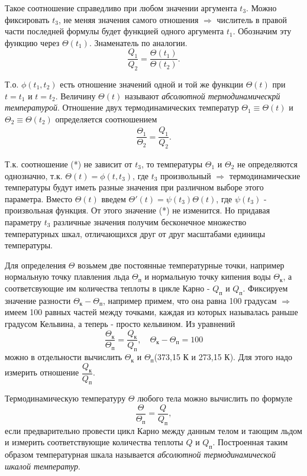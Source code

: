 \documentclass[14pt,a4paper]{scrartcl}
\begin{document}
		\quad Такое соотношение справедливо при любом значении аргумента $t_3$. Можно фиксировать  $t_3$, не меняя значения самого отношения $\Rightarrow$ числитель в правой части последней формулы будет функцией одного аргумента $t_1$. Обозначим эту функцию через $\Theta(t_1)$. Знаменатель по аналогии. $$\dfrac{Q_1}{Q_2} = \dfrac{\Theta(t_1)}{\Theta(t_2)}.$$
		
		\quad Т.о. $ \phi(t_1, t_2) $ есть отношение значений одной и той же функции $\Theta(t)$ при $t = t_1$ и $t = t_2$.  Величину $\Theta(t)$ называют \textit{абсолютной термодинамическрй температурой}. Отношение двух термодинамических температур $\Theta_1 \equiv \Theta(t)$ и $\Theta_2 \equiv \Theta(t_2)$ определяется соотношением \begin{align}\dfrac{\Theta_1}{\Theta_2} = \dfrac{Q_1}{Q_2}.\tag{*}\end{align}
		
		\quad Т.к. соотношение (*) не зависит от $t_3$, то температуры $\Theta_1$ и $\Theta_2$ не определяются однозначно, т.к. $\Theta(t) = \phi(t, t_3)$, где $t_3$ произвольный $\Rightarrow$ термодинамические температуры будут иметь разные значения при различном выборе этого параметра. Вместо $\Theta(t)$ введем $\Theta'(t) = \psi(t_3)\Theta(t)$, где $\psi(t_3)$ - произвольная функция. От этого значение (*) не изменится. Но придавая параметру $t_3$ различные значения получим бесконечное множество температурных шкал, отличающихся друг от друг масштабами единицы температуры.
		
		\quad Для определения $\Theta$ возьмем две постоянные температурные точки, например нормальную точку плавления льда $\Theta_{\text{п}}$ и нормальную точку кипения воды  $\Theta_{\text{к}}$, а соответсвующие им количества теплоты в цикле Карно - $Q_{\text{п}}$ и $Q_{\text{п}}$. Фиксируем значение разности $\Theta_{\text{к}} - \Theta_{\text{п}}$, например примем, что она равна 100  градусам $\Rightarrow$ имеем 100 равных частей между точками, каждая из которых называлась раньше градусом Кельвина, а теперь - просто кельвином. Из уравнений $$\dfrac{\Theta_{\text{к}}}{\Theta_{\text{п}}} = \dfrac{Q_{\text{к}}}{Q_{\text{п}}}, \quad \Theta_{\text{к}} - \Theta_{\text{п}} = 100$$ можно в отдельности вычислить  $ \Theta_{\text{к}}  $ и $ \Theta_{\text{п}} $(373,15 К и 273,15 К). Для этого надо измерить отношение $\dfrac{Q_{\text{к}}}{Q_{\text{п}}}$. 
		
		\quad Термодинамическую температуру $\Theta$ любого тела можно вычислить по формуле $$\dfrac{\Theta}{\Theta_{\text{п}}}=\dfrac{Q}{Q_{\text{п}}},$$ если предварительно провести цикл Карно между данным телом и тающим льдом и измерить соответствующие количества теплоты $Q$ и $Q_{\text{п}}$. Построенная таким образом температурная шкала называется \textit{абсолютной термодинамической шкалой температур}.\\
		
\end{document}
